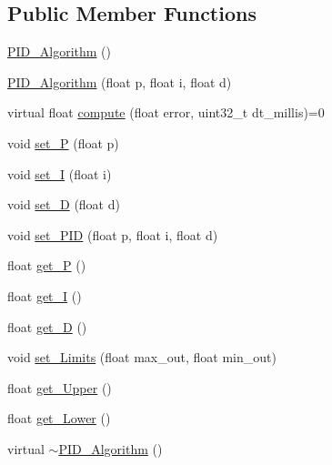 \subsection*{Public Member Functions}
\begin{DoxyCompactItemize}
\item 
\mbox{\hyperlink{class_p_i_d___algorithm_a77e1b4df4f9605df9373deb336c47987}{P\+I\+D\+\_\+\+Algorithm}} ()
\item 
\mbox{\hyperlink{class_p_i_d___algorithm_afa89df608678228c8ecbb73c5953d0b4}{P\+I\+D\+\_\+\+Algorithm}} (float p, float i, float d)
\item 
virtual float \mbox{\hyperlink{class_p_i_d___algorithm_a388ec97d23c981e62c3726505688e1f0}{compute}} (float error, uint32\+\_\+t dt\+\_\+millis)=0
\item 
void \mbox{\hyperlink{class_p_i_d___algorithm_a6248cf0e2677a45193c9b43b0001ee44}{set\+\_\+P}} (float p)
\item 
void \mbox{\hyperlink{class_p_i_d___algorithm_a06fbd1eb698b088e5378a224521a5323}{set\+\_\+I}} (float i)
\item 
void \mbox{\hyperlink{class_p_i_d___algorithm_a6e830c2340d3cebb2131a9308f558746}{set\+\_\+D}} (float d)
\item 
void \mbox{\hyperlink{class_p_i_d___algorithm_a1f6955b8c523af6e5207b598872b00f9}{set\+\_\+\+P\+ID}} (float p, float i, float d)
\item 
float \mbox{\hyperlink{class_p_i_d___algorithm_a0dd1059744956de2a09c72bd607ee2f4}{get\+\_\+P}} ()
\item 
float \mbox{\hyperlink{class_p_i_d___algorithm_a6305260cd346415953b41fb765d33740}{get\+\_\+I}} ()
\item 
float \mbox{\hyperlink{class_p_i_d___algorithm_a5a113c3d88ee8af75af7248fb590f538}{get\+\_\+D}} ()
\item 
void \mbox{\hyperlink{class_p_i_d___algorithm_a100df14fcad2a1bbcb67c53b7d664d8a}{set\+\_\+\+Limits}} (float max\+\_\+out, float min\+\_\+out)
\item 
float \mbox{\hyperlink{class_p_i_d___algorithm_a0adcbfe07b44479d3c46d20037bf1013}{get\+\_\+\+Upper}} ()
\item 
float \mbox{\hyperlink{class_p_i_d___algorithm_a2029e728fcc641ba204b44ef2c6dd2d9}{get\+\_\+\+Lower}} ()
\item 
virtual \mbox{\hyperlink{class_p_i_d___algorithm_ad6a88132e10c378e7ebe9959898278e6}{$\sim$\+P\+I\+D\+\_\+\+Algorithm}} ()
\end{DoxyCompactItemize}
